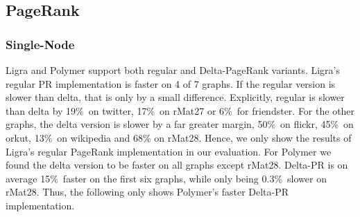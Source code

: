 

\subsection{PageRank}
\subsubsection{Single-Node}

Ligra and Polymer support both regular and Delta-PageRank variants.
Ligra's regular PR implementation is faster on 4 of 7 graphs. If the regular version is slower than delta, that is only by a small difference. Explicitly, regular is slower than delta by 19\%\ on twitter, 17\%\ on rMat27 or 6\%\ for friendster. For the other graphs, the delta version is slower by a far greater margin, 50\%\ on flickr, 45\%\ on orkut, 13\%\ on wikipedia and 68\% on rMat28.
Hence, we only show the results of Ligra's regular PageRank implementation in our evaluation.
For Polymer we found the delta version to be faster on all graphs except rMat28. Delta-PR is on average 15\%\ faster on the first six graphs, while only being 0.3\%\ slower on rMat28.
Thus, the following only shows Polymer's faster Delta-PR implementation.



